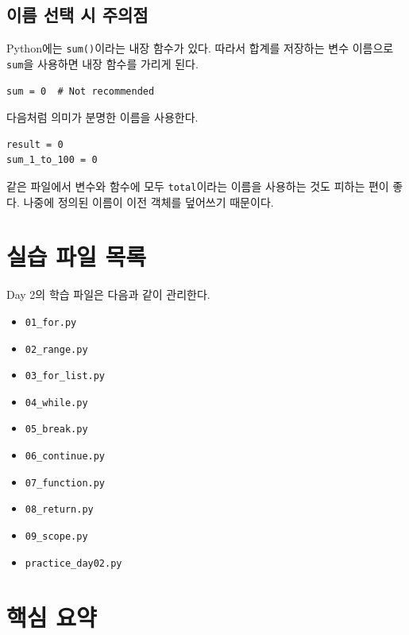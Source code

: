 \documentclass[11pt,a4paper]{article}
\begin{document}
\subsection{이름 선택 시 주의점}

Python에는 \texttt{sum()}이라는 내장 함수가 있다. 따라서 합계를 저장하는 변수 이름으로 \texttt{sum}을 사용하면 내장 함수를 가리게 된다.

\begin{lstlisting}
sum = 0  # Not recommended
\end{lstlisting}

다음처럼 의미가 분명한 이름을 사용한다.

\begin{lstlisting}
result = 0
sum_1_to_100 = 0
\end{lstlisting}

같은 파일에서 변수와 함수에 모두 \texttt{total}이라는 이름을 사용하는 것도 피하는 편이 좋다. 나중에 정의된 이름이 이전 객체를 덮어쓰기 때문이다.

\section{실습 파일 목록}

\begin{practicebox}
Day 2의 학습 파일은 다음과 같이 관리한다.
\begin{itemize}[leftmargin=1.5em]
    \item \texttt{01\_for.py}
    \item \texttt{02\_range.py}
    \item \texttt{03\_for\_list.py}
    \item \texttt{04\_while.py}
    \item \texttt{05\_break.py}
    \item \texttt{06\_continue.py}
    \item \texttt{07\_function.py}
    \item \texttt{08\_return.py}
    \item \texttt{09\_scope.py}
    \item \texttt{practice\_day02.py}
\end{itemize}
\end{practicebox}

\section{핵심 요약}
\end{document}
